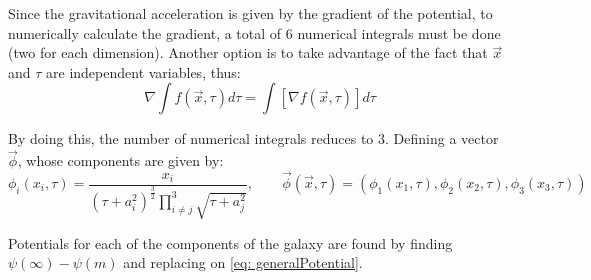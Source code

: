 	Since the gravitational acceleration is given by the gradient of the potential, to numerically calculate the gradient, a total of 6 numerical integrals must be done (two for each dimension). Another option is to take advantage of the fact that $\vec{x}$ and $\tau$ are independent variables, thus:
	\begin{equation}
		\nabla \int f(\vec{x}, \tau)d\tau = \int [\nabla f(\vec{x}, \tau)] d\tau
	\end{equation}
	
	By doing this, the number of numerical integrals reduces to 3. Defining a vector $\vec{\phi}$, whose components are given by:
	\begin{equation}
		\phi_i(x_i, \tau) = \dfrac{x_i}{\left(\tau + a_i^2\right)^{\frac{3}{2}} \prod\limits_{i \neq j}^3\sqrt{\tau + a_j^2}}, \qquad \vec{\phi}(\vec{x}, \tau) = (\phi_1(x_1, \tau), \phi_2(x_2, \tau), \phi_3(x_3, \tau))
	\end{equation}
	
	Potentials for each of the components of the galaxy are found by finding $\psi(\infty) - \psi(m)$ and replacing on \autoref{eq: generalPotential}.
	
